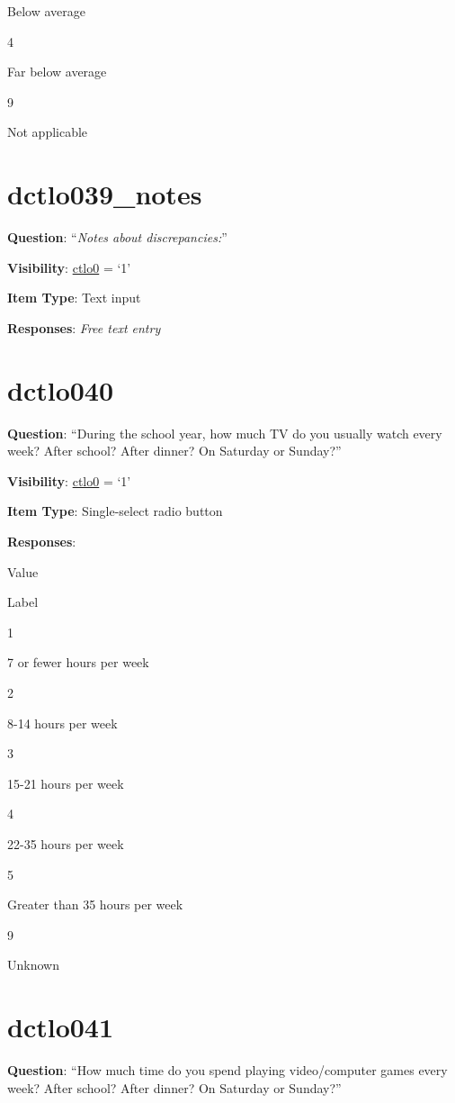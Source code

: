 \documentclass[]{book}
\begin{document}
Below average

4

Far below average

9

Not applicable

\hypertarget{dctlo039_notes}{%
\section{dctlo039\_notes}\label{dctlo039_notes}}

\textbf{Question}: ``\emph{Notes about discrepancies:}''

\textbf{Visibility}: \protect\hyperlink{ctlo0}{ctlo0} = `1'

\textbf{Item Type}: Text input

\textbf{Responses}: \emph{Free text entry}

\hypertarget{dctlo040}{%
\section{dctlo040}\label{dctlo040}}

\textbf{Question}: ``During the school year, how much TV do you usually watch every week? After school? After dinner? On Saturday or Sunday?''

\textbf{Visibility}: \protect\hyperlink{ctlo0}{ctlo0} = `1'

\textbf{Item Type}: Single-select radio button

\textbf{Responses}:

Value

Label

1

7 or fewer hours per week

2

8-14 hours per week

3

15-21 hours per week

4

22-35 hours per week

5

Greater than 35 hours per week

9

Unknown

\hypertarget{dctlo041}{%
\section{dctlo041}\label{dctlo041}}

\textbf{Question}: ``How much time do you spend playing video/computer games every week? After school? After dinner? On Saturday or Sunday?''
\end{document}
